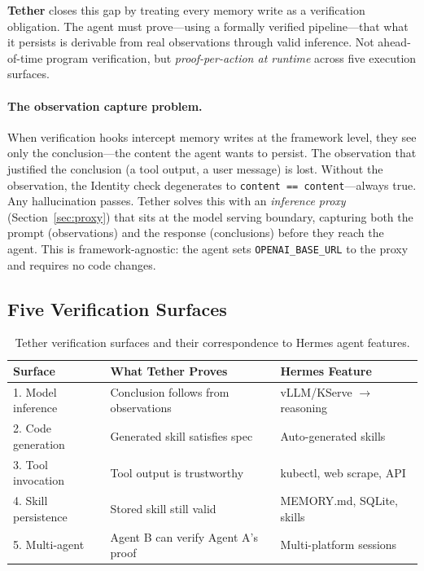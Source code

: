 \documentclass[sigplan,screen,nonacm]{acmart}
\begin{document}
\textbf{Tether} closes this gap by treating every memory write as a
verification obligation. The agent must prove---using a formally verified
pipeline---that what it persists is derivable from real observations through
valid inference. Not ahead-of-time program verification, but
\emph{proof-per-action at runtime} across five execution surfaces.

\paragraph{The observation capture problem.}
When verification hooks intercept memory writes at the framework level, they
see only the conclusion---the content the agent wants to persist. The
observation that justified the conclusion (a tool output, a user message) is
lost. Without the observation, the Identity check degenerates to
\texttt{content == content}---always true. Any hallucination passes. Tether
solves this with an \emph{inference proxy} (Section~\ref{sec:proxy}) that
sits at the model serving boundary, capturing both the prompt (observations)
and the response (conclusions) before they reach the agent. This is
framework-agnostic: the agent sets \texttt{OPENAI\_BASE\_URL} to the proxy
and requires no code changes.

\subsection{Five Verification Surfaces}

\begin{table}[t]
\caption{Tether verification surfaces and their correspondence to Hermes agent features.}
\label{tab:surfaces}
\small
\begin{tabular}{@{}lll@{}}
\toprule
\textbf{Surface} & \textbf{What Tether Proves} & \textbf{Hermes Feature} \\
\midrule
1. Model inference & Conclusion follows from observations & vLLM/KServe $\to$ reasoning \\
2. Code generation & Generated skill satisfies spec & Auto-generated skills \\
3. Tool invocation & Tool output is trustworthy & kubectl, web scrape, API \\
4. Skill persistence & Stored skill still valid & MEMORY.md, SQLite, skills \\
5. Multi-agent & Agent B can verify Agent A's proof & Multi-platform sessions \\
\bottomrule
\end{tabular}
\end{table}
\end{document}
